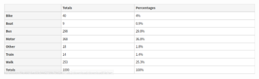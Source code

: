 \begin{questions}
\begin{center}
            \end{center}
            \begin{center}
              \includegraphics[width=\textwidth]{stats-transport2017}
            \end{center}
\end{questions}



